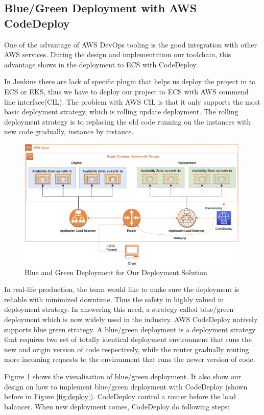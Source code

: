 \subsection{Blue/Green Deployment with AWS CodeDeploy}
One of the advantage of AWS DevOps tooling is the good integration with other AWS services. During the design and implementation our toolchain, this advantage shows in the deployment to ECS with CodeDeploy.
\par
In Jenkins there are lack of specific plugin that helps us deploy the project in to ECS or EKS, thus we have to deploy our project to ECS with AWS commend line interface(CIL). The problem with AWS CIL is that it only supports the most basic deployment strategy, which is rolling update deployment. The rolling deployment strategy is to replacing the old code running on the instances with new code gradually, instance by instance. 
\begin{figure}[h]
    \centering
    \includegraphics[width=0.99\textwidth]{pics/bg.png}
    \caption{Blue and Green Deployment for Our Deployment Solution}
    \label{fig:bg}
\end{figure}
\par
In real-life production, the team would like to make sure the deployment is reliable with minimized downtime. Thus the safety in highly valued in deployment strategy. In answering this need, a strategy called blue/green deployment which is now widely used in the industry. AWS CodeDeploy natively supports blue green strategy.
A blue/green deployment is a deployment strategy that requires two set of totally identical deployment environment that runs the new and origin version of code respectively, while the router gradually routing more incoming requests to the environment that runs the newer version of code. 
\par
Figure \ref{fig:bg} shows the visualisation of blue/green deployment. It also show our design on how to implement blue/green deployment with CodeDeploy (shown before in Figure \ref{fig:deploy}). CodeDeploy control a router before the load balancer. When new deployment comes, CodeDeploy do following steps:
